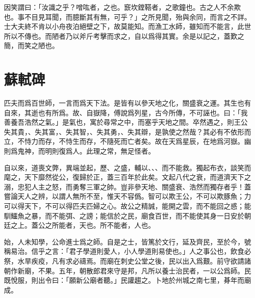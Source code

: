因笑謂曰：「汝識之乎？噌吰者，之也。窾坎鏜鞳者，之歌鐘也。古之人不余欺也。事不目見耳聞，而臆斷其有無，可乎？」之所見聞，殆與余同，而言之不詳。士大夫終不肯以小舟夜泊絕壁之下，故莫能知。而漁工水師，雖知而不能言，此世所以不傳也。而陋者乃以斧斤考擊而求之，自以爲得其實。余是以記之，蓋歎之簡，而笑之陋也。

\theendnotes

\section[潮州韓文公廟碑\quad{\small 蘇軾}]{{\normalsize 蘇軾}\quad {}碑}
匹夫而爲百世師，一言而爲天下法。是皆有以參天地之化，關盛衰之運。其生也有自來，其逝也有所爲。故、自嶽降，傅說爲列星，古今所傳，不可誣也。曰：「我善養吾浩然之氣。」是氣也，寓於尋常之中，而塞乎天地之間。卒然遇之，則王公失其貴，、失其富，、失其智，、失其勇，、失其{辯}，是孰使之然哉？其必有不依形而立，不恃力而存，不恃生而存，不隨死而亡者矣。故在天爲星辰，在地爲河嶽。幽則爲鬼神，而明則復爲人。此理之常，無足怪者。%

自以來，道喪文弊，異端並起，歷、之盛，輔以、、、而不能救。獨起布衣，談笑而麾之，天下靡然從公，復歸於正，蓋三百年於此矣。文起八代之衰，而道濟天下之溺，忠犯人主之怒，而勇奪三軍之帥。豈非參天地、關盛衰、浩然而獨存者乎！蓋嘗論天人之辨，以謂人無所不至，惟天不容僞。智可以欺王公，不可以欺豚魚；力可以得天下，不可以得匹夫匹婦之心。故公之精誠，能開之雲，而不能回之惑；能馴鱷魚之暴，而不能弭、之謗；能信於之民，廟食百世，而不能使其身一日安於朝廷之上。蓋公之所能者，天也。所不能者，人也。

始，人未知學，公命進士爲之師。自是之士，皆篤於文行，延及齊民，至於今，號稱易治。信乎之言：「君子學道則愛人，小人學道則易使也。」人之事公也，飲食必祭，水旱疾疫，凡有求必禱焉。而廟在刺史公堂之後，民以出入爲艱。前守欲請諸朝作新廟，不果。五年，朝散郎君來守是邦，凡所以養士治民者，一以公爲師。民既悅服，則出令曰：「願新公廟者聽。」民{讙}趨之。卜地於州城之南七里，朞年而廟成。%

